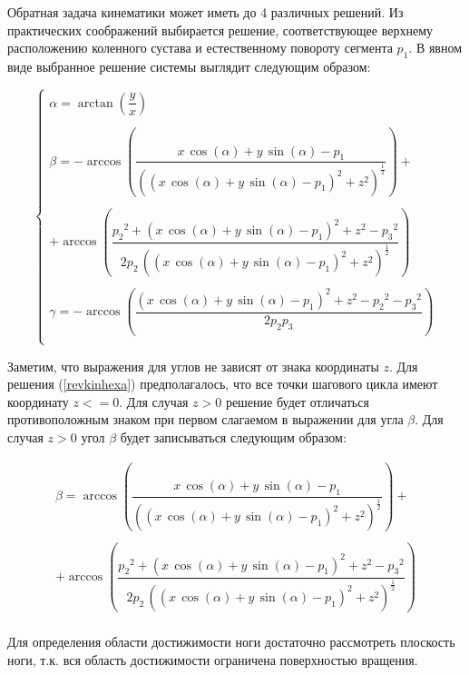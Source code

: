 Обратная задача кинематики может иметь до 4 различных решений. Из практических соображений выбирается решение, соответствующее верхнему расположению коленного сустава и естественному повороту сегмента  $p_1$.
В явном виде выбранное решение системы выглядит следующим образом:

\begin{equation}
\left\{
\begin{array}{lcr}
\alpha = \arctan\left(\dfrac{y}{x}\right)\\
\\
\beta = -\arccos\left(\dfrac{x\,\cos(\alpha)+y\,\sin(\alpha)-p_1}{\left((x\,\cos(\alpha)+y\,\sin(\alpha)-p_1)^2+z^2\right)^{\frac{1}{2}}}\right)+\\
\\
+\arccos\left(\dfrac{{p_2}^2+(x\,\cos(\alpha)+y\,\sin(\alpha)-p_1)^2+z^2-{p_3}^2}{2p_2\,((x\,\cos(\alpha)+y\,\sin(\alpha)-p_1)^2+z^2)^{\frac{1}{2}}}\right)\\
\\
\gamma = -\arccos\left(\dfrac{(x\,\cos(\alpha)+y\,\sin(\alpha)-p_1)^2+z^2-{p_2}^2-{p_3}^2}{2p_2p_3}\right)\\
\end{array}
\right.
\label{revkinhexa}
\end{equation}

Заметим, что выражения для углов не зависят от знака координаты $z$. Для решения (\ref{revkinhexa}) предполагалось, что все точки шагового цикла имеют координату $z<=0$. Для случая $z>0$ решение будет отличаться противоположным знаком  при первом слагаемом в выражении для угла $\beta$. Для случая $z>0$ угол $\beta$ будет записываться следующим образом:

\begin{equation}
\begin{array}{lcr}
\beta = \arccos\left(\dfrac{x\,\cos(\alpha)+y\,\sin(\alpha)-p_1}{\left((x\,\cos(\alpha)+y\,\sin(\alpha)-p_1)^2+z^2\right)^{\frac{1}{2}}}\right)+\\
\\
+\arccos\left(\dfrac{{p_2}^2+(x\,\cos(\alpha)+y\,\sin(\alpha)-p_1)^2+z^2-{p_3}^2}{2p_2\,((x\,\cos(\alpha)+y\,\sin(\alpha)-p_1)^2+z^2)^{\frac{1}{2}}}\right)\\
\end{array}
\end{equation}

Для определения области достижимости ноги достаточно рассмотреть плоскость ноги, т.к. вся область достижимости ограничена поверхностью вращения.

